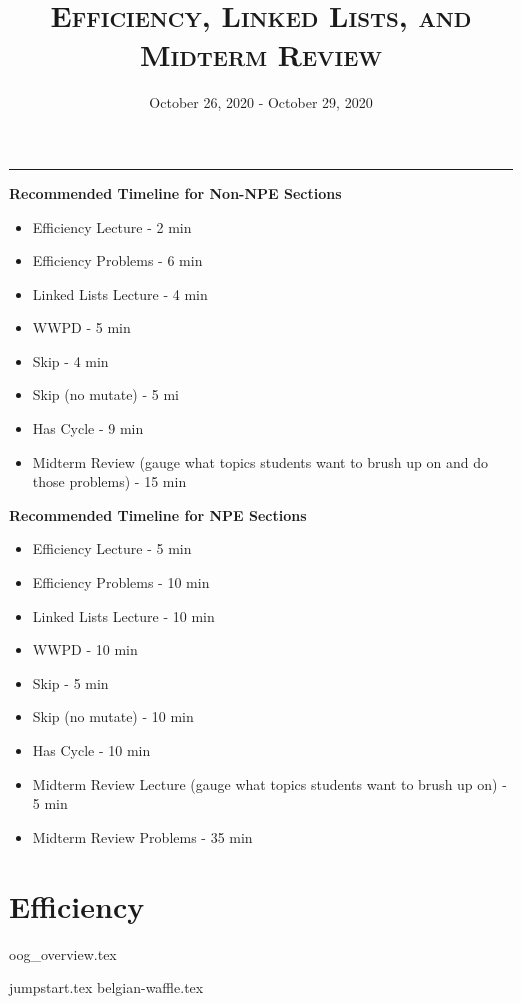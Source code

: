 \documentclass{exam}
\title{\textsc{Efficiency, Linked Lists, and Midterm Review}}
\date{October 26, 2020 - October 29, 2020}
\begin{document}
\maketitle
\rule{\textwidth}{0.15em}
\fontsize{12}{15}\selectfont

\begin{guide}
\textbf{Recommended Timeline for Non-NPE Sections}
\begin{itemize}
    \item Efficiency Lecture - 2 min
    \item Efficiency Problems - 6 min
    \item Linked Lists Lecture - 4 min
    \item WWPD - 5 min
    \item Skip - 4 min
    \item Skip (no mutate) - 5 mi
    \item Has Cycle - 9 min
    \item Midterm Review (gauge what topics students want to brush up on and do those problems) - 15 min
\end{itemize}
\vspace{.5cm}
\textbf{Recommended Timeline for NPE Sections}
\begin{itemize}
    \item Efficiency Lecture - 5 min
    \item Efficiency Problems - 10 min
    \item Linked Lists Lecture - 10 min
    \item WWPD - 10 min
    \item Skip - 5 min
    \item Skip (no mutate) - 10 min
    \item Has Cycle - 10 min
    \item Midterm Review Lecture (gauge what topics students want to brush up on) - 5 min
    \item Midterm Review Problems - 35 min
\end{itemize}
\newpage
\end{guide}

\section{Efficiency}
{oog_overview.tex}
\begin{questions}
{jumpstart.tex}
{belgian-waffle.tex}
\end{questions}
\end{document}
